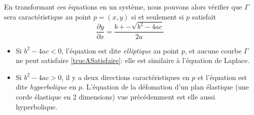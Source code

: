 \documentclass[12pt]{article}
\begin{document}
En transformant ces équations en un système, nous pouvons alors vérifier que $\Gamma$ sera caractéristique au point $p = (x,y)$ si et seulement si $p$ satisfait
\begin{equation}\label{trucASatisfaire}
\frac{\partial y}{\partial x} = \frac{b +- \sqrt{b^2 - 4ac}}{2a}
\end{equation}
\begin{itemize}
\item Si $b^2 - 4ac <0$,  l'équation est dite \emph{elliptique} au point $p$,  et aucune courbe $\Gamma$ ne peut satisfaire \eqref{trucASatisfaire}: elle est similaire à l'équation de Laplace.
\item Si $b^2 - 4ac >0$, il y a deux directions caractéristiques en $p$ et l'équation est dite \emph{hyperbolique} en $p$.  L'équation de la défomation d'un plan élastique (une corde élastique en 2 dimensions) vue précédemment est elle aussi hyperbolique.
\end{itemize}
\end{document}
